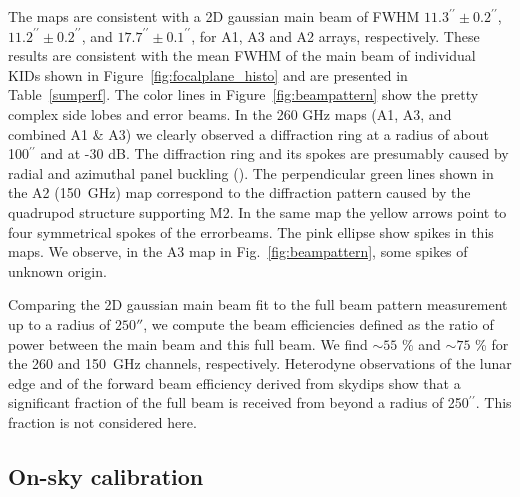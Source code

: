 \documentclass[]{aa} %
\begin{document}
The maps are consistent with a 2D gaussian main beam of FWHM $11.3^{\prime \prime} \pm 0.2^{\prime \prime}$, $11.2^{\prime \prime} \pm 0.2^{\prime \prime}$, and $17.7^{\prime \prime} \pm 0.1^{\prime \prime}$, for A1, A3 and A2 arrays, respectively. These results are consistent with the mean FWHM of the main beam of individual KIDs shown in Figure~\ref{fig:focalplane_histo} and are presented in Table~\ref{sumperf}. The color lines in Figure~\ref{fig:beampattern} show the pretty complex side lobes and error beams. In the 260 GHz maps (A1, A3, and combined A1 \& A3) we clearly observed a diffraction ring at a radius of about 100$^{\prime \prime}$ and at -30 dB. The diffraction ring and its spokes are presumably caused by radial and azimuthal panel buckling (\cite{greve1998}). The perpendicular green lines shown in the A2 (150~GHz) map correspond to the diffraction pattern caused by the quadrupod structure supporting M2. In the same map the yellow arrows point to four symmetrical spokes of the errorbeams. The pink ellipse show spikes in this maps. We observe, in the A3 map in Fig.~\ref{fig:beampattern}, some spikes of unknown origin.

Comparing the 2D gaussian main beam fit to the full beam pattern measurement up to a radius of $250''$, we compute the beam efficiencies defined as the ratio of power between the main beam and this full beam. We find $\sim 55$ \% and $\sim 75$ \% for the 260 and 150~GHz channels, respectively.
Heterodyne observations of the lunar edge and of the forward beam efficiency derived from skydips show that a significant fraction of the full beam is received from beyond a radius of 250$^{\prime \prime}$. This fraction is not considered here.

\subsection{On-sky calibration}
\label{On-sky calibration}
\end{document}
